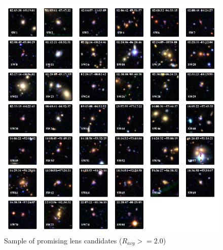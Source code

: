 \documentclass[useAMS,usenatbib,a4paper]{mn2e}
\begin{document}
%
%
%
%
%

\begin{figure}
\begin{center}
\includegraphics[scale=1.5]{sw-cfhtls-figs/lenscand_2p0_3p0.pdf}
\caption{ \label{fig:lch1}
Sample of promising lens candidates ($R_{avg}>=2.0$)
}
\end{center}
\end{figure}
\end{document}
